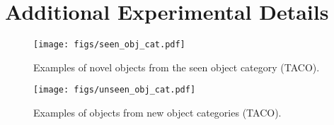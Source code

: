 \section{Additional Experimental Details} \label{sec:supp_exp_details}






\begin{figure}[h]
  \centering
  \texttt{[image: figs/seen\_obj\_cat.pdf]}
  \caption{
  Examples of novel objects from the seen object category (TACO). 
  }
  \label{fig_seen_obj_cat}
\end{figure}

\begin{figure}[h]
  \centering
  \texttt{[image: figs/unseen\_obj\_cat.pdf]}
  \caption{
  Examples of objects from new object categories (TACO). 
  }
  \label{fig_unseen_obj_cat}
\end{figure}

